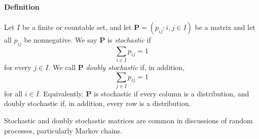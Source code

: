 \documentclass[12pt]{article}
\newcommand{\mv}[1]{\mathbf{#1}}	%
\begin{document}
\paragraph{Definition}
Let $I$ be a finite or countable set, and let $\mv{P} = (p_{ij} : i,j \in I)$ be a matrix and let all $p_{ij}$ be nonnegative.  We say $\mv{P}$ is \emph{stochastic} if $$\sum_{i\in I} p_{ij} = 1$$  
for every $j\in I$. We call $\mv{P}$ \emph{doubly stochastic} if, in addition, $$\sum_{j\in I} p_{ij} = 1$$
for all $i\in I$.
Equivalently, $\mv{P}$ is stochastic if every column is a distribution, and doubly stochastic if, in addition, every row is a distribution.

Stochastic and doubly stochastic matrices are common in discussions of random processes, particularly Markov chains.
\end{document}

